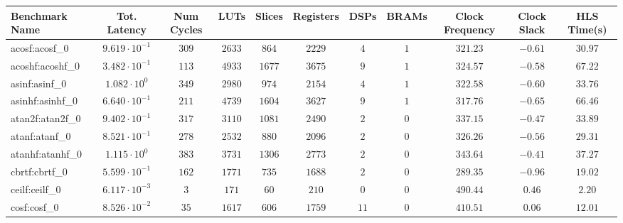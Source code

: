 \begin{tabular}{|l|c|c|c|c|c|c|c|c|c|c|}
\hline
Benchmark Name               & Tot. Latency            & Num Cycles & LUTs      & Slices    & Registers & DSPs    & BRAMs & Clock Frequency & Clock Slack & HLS Time(s) \\
\hline
acosf:acosf\_0               & $ 9.619 \cdot 10^{-1} $ & $ 309    $ & $ 2633  $ & $ 864   $ & $ 2229  $ & $ 4   $ & $ 1 $ & $ 321.23      $ & $ -0.61   $ & $ 30.97   $ \\
acoshf:acoshf\_0             & $ 3.482 \cdot 10^{-1} $ & $ 113    $ & $ 4933  $ & $ 1677  $ & $ 3675  $ & $ 9   $ & $ 1 $ & $ 324.57      $ & $ -0.58   $ & $ 67.22   $ \\
asinf:asinf\_0               & $ 1.082 \cdot 10^{0}  $ & $ 349    $ & $ 2980  $ & $ 974   $ & $ 2154  $ & $ 4   $ & $ 1 $ & $ 322.58      $ & $ -0.60   $ & $ 33.76   $ \\
asinhf:asinhf\_0             & $ 6.640 \cdot 10^{-1} $ & $ 211    $ & $ 4739  $ & $ 1604  $ & $ 3627  $ & $ 9   $ & $ 1 $ & $ 317.76      $ & $ -0.65   $ & $ 66.46   $ \\
atan2f:atan2f\_0             & $ 9.402 \cdot 10^{-1} $ & $ 317    $ & $ 3110  $ & $ 1081  $ & $ 2490  $ & $ 2   $ & $ 0 $ & $ 337.15      $ & $ -0.47   $ & $ 33.89   $ \\
atanf:atanf\_0               & $ 8.521 \cdot 10^{-1} $ & $ 278    $ & $ 2532  $ & $ 880   $ & $ 2096  $ & $ 2   $ & $ 0 $ & $ 326.26      $ & $ -0.56   $ & $ 29.31   $ \\
atanhf:atanhf\_0             & $ 1.115 \cdot 10^{0}  $ & $ 383    $ & $ 3731  $ & $ 1306  $ & $ 2773  $ & $ 2   $ & $ 0 $ & $ 343.64      $ & $ -0.41   $ & $ 37.27   $ \\
cbrtf:cbrtf\_0               & $ 5.599 \cdot 10^{-1} $ & $ 162    $ & $ 1771  $ & $ 735   $ & $ 1688  $ & $ 2   $ & $ 0 $ & $ 289.35      $ & $ -0.96   $ & $ 19.02   $ \\
ceilf:ceilf\_0               & $ 6.117 \cdot 10^{-3} $ & $ 3      $ & $ 171   $ & $ 60    $ & $ 210   $ & $ 0   $ & $ 0 $ & $ 490.44      $ & $ 0.46    $ & $ 2.20    $ \\
cosf:cosf\_0                 & $ 8.526 \cdot 10^{-2} $ & $ 35     $ & $ 1617  $ & $ 606   $ & $ 1759  $ & $ 11  $ & $ 0 $ & $ 410.51      $ & $ 0.06    $ & $ 12.01   $ \\

\end{tabular}
